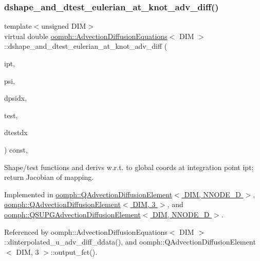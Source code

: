 \subsubsection{\texorpdfstring{dshape\+\_\+and\+\_\+dtest\+\_\+eulerian\+\_\+at\+\_\+knot\+\_\+adv\+\_\+diff()}{dshape\_and\_dtest\_eulerian\_at\_knot\_adv\_diff()}}
{\footnotesize\ttfamily template$<$unsigned D\+IM$>$ \\
virtual double \hyperlink{classoomph_1_1AdvectionDiffusionEquations}{oomph\+::\+Advection\+Diffusion\+Equations}$<$ D\+IM $>$\+::dshape\+\_\+and\+\_\+dtest\+\_\+eulerian\+\_\+at\+\_\+knot\+\_\+adv\+\_\+diff (\begin{DoxyParamCaption}\item[{const unsigned \&}]{ipt,  }\item[{\hyperlink{classoomph_1_1Shape}{Shape} \&}]{psi,  }\item[{\hyperlink{classoomph_1_1DShape}{D\+Shape} \&}]{dpsidx,  }\item[{\hyperlink{classoomph_1_1Shape}{Shape} \&}]{test,  }\item[{\hyperlink{classoomph_1_1DShape}{D\+Shape} \&}]{dtestdx }\end{DoxyParamCaption}) const\hspace{0.3cm}{\ttfamily [protected]}, {}}



Shape/test functions and derivs w.\+r.\+t. to global coords at integration point ipt; return Jacobian of mapping. 



Implemented in \hyperlink{classoomph_1_1QAdvectionDiffusionElement_afc66bf00b79622cc6580787b9d86f215}{oomph\+::\+Q\+Advection\+Diffusion\+Element$<$ D\+I\+M, N\+N\+O\+D\+E\+\_\+D $>$}, \hyperlink{classoomph_1_1QAdvectionDiffusionElement_afc66bf00b79622cc6580787b9d86f215}{oomph\+::\+Q\+Advection\+Diffusion\+Element$<$ D\+I\+M, 3 $>$}, and \hyperlink{classoomph_1_1QSUPGAdvectionDiffusionElement_af77acfc13df8c460118d2c1bfbf0d74d}{oomph\+::\+Q\+S\+U\+P\+G\+Advection\+Diffusion\+Element$<$ D\+I\+M, N\+N\+O\+D\+E\+\_\+D $>$}.



Referenced by oomph\+::\+Advection\+Diffusion\+Equations$<$ D\+I\+M $>$\+::dinterpolated\+\_\+u\+\_\+adv\+\_\+diff\+\_\+ddata(), and oomph\+::\+Q\+Advection\+Diffusion\+Element$<$ D\+I\+M, 3 $>$\+::output\+\_\+fct().

\mbox{\label{classoomph_1_1AdvectionDiffusionEquations_a2c94e14a6b53e3cce43b83d8c8329174}} 
